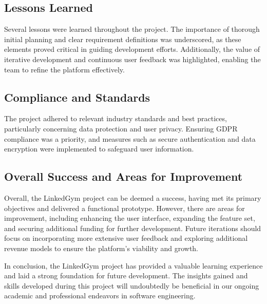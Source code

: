 \subsection{Lessons Learned}
Several lessons were learned throughout the project. The importance of thorough initial planning and clear requirement definitions was underscored, as these elements proved critical in guiding development efforts. Additionally, the value of iterative development and continuous user feedback was highlighted, enabling the team to refine the platform effectively.

\subsection{Compliance and Standards}
The project adhered to relevant industry standards and best practices, particularly concerning data protection and user privacy. Ensuring GDPR compliance was a priority, and measures such as secure authentication and data encryption were implemented to safeguard user information.

\subsection{Overall Success and Areas for Improvement}
Overall, the LinkedGym project can be deemed a success, having met its primary objectives and delivered a functional prototype. However, there are areas for improvement, including enhancing the user interface, expanding the feature set, and securing additional funding for further development. Future iterations should focus on incorporating more extensive user feedback and exploring additional revenue models to ensure the platform's viability and growth.

In conclusion, the LinkedGym project has provided a valuable learning experience and laid a strong foundation for future development. The insights gained and skills developed during this project will undoubtedly be beneficial in our ongoing academic and professional endeavors in software engineering.

\clearpage